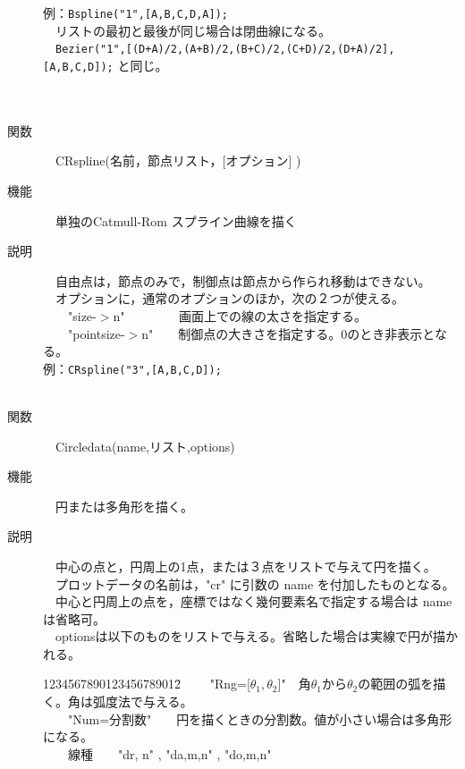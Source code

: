 \documentclass[papersize,a4paper,12pt,uplatex]{jsarticle}
\begin{document}
\begin{description}
例：\verb|Bspline("1",[A,B,C,D,A]);|\\
　リストの最初と最後が同じ場合は閉曲線になる。\\
　\verb|Bezier("1",[(D+A)/2,(A+B)/2,(B+C)/2,(C+D)/2,(D+A)/2],[A,B,C,D]);| と同じ。\\
　\\
　　　　
　\\
\hypertarget{crspline}{}
\item[関数]　CRspline(名前，節点リスト，[オプション] )
\item[機能]　単独のCatmull-Rom スプライン曲線を描く
\item[説明]
　自由点は，節点のみで，制御点は節点から作られ移動はできない。\\
　オプションに，通常のオプションのほか，次の２つが使える。\\
　　"size-$>$n" 　　　　画面上での線の太さを指定する。\\
　　"pointsize-$>$n"　　制御点の大きさを指定する。0のとき非表示となる。\\

例：\verb|CRspline("3",[A,B,C,D]);|\\
　　　
　\\
\hypertarget{circledata}{}
\item[関数]　Circledata(name,リスト,options)　
\item[機能]　円または多角形を描く。
\item[説明]　中心の点と，円周上の1点，または３点をリストで与えて円を描く。\\
　プロットデータの名前は，"cr" に引数の name を付加したものとなる。\\
　中心と円周上の点を，座標ではなく幾何要素名で指定する場合は name は省略可。\\
　optionsは以下のものをリストで与える。省略した場合は実線で円が描かれる。
\begin{tabbing}
1234567890123456789012\=\kill
　　"Rng=[$θ_1,θ_2$]"　\>角$θ_1$から$θ_2$の範囲の弧を描く。角は弧度法で与える。\\
　　"Num=分割数"　　\>円を描くときの分割数。値が小さい場合は多角形になる。\\
　　線種　　\>"dr, n"  , "da,m,n" , "do,m,n"\\


\end{tabbing}
\end{description}
\end{document}
